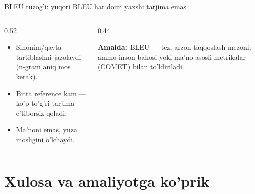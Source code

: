 \documentclass[aspectratio=169,11pt]{beamer}
\begin{document}
\begin{frame}{BLEU tuzog'i: yuqori BLEU har doim yaxshi tarjima emas}
  \begin{columns}[T]
    \begin{column}{0.52\textwidth}
      \begin{tcolorbox}[warnbox,title=Cheklovlar]
        \small
        \begin{itemize}\setlength\itemsep{2pt}
          \item Sinonim/qayta tartiblashni jazolaydi (n-gram aniq mos kerak).
          \item Bitta reference kam --- ko'p to'g'ri tarjima e'tiborsiz qoladi.
          \item Ma'noni emas, yuza mosligini o'lchaydi.
        \end{itemize}
      \end{tcolorbox}
    \end{column}
    \begin{column}{0.44\textwidth}
      \begin{tcolorbox}[okbox,top=2pt,bottom=2pt]
        \footnotesize
        \textbf{Amalda:} BLEU --- tez, arzon taqqoslash mezoni; ammo inson bahosi
        yoki ma'no-asosli metrikalar (COMET) bilan to'ldiriladi.
      \end{tcolorbox}
    \end{column}
  \end{columns}
\end{frame}

\section[Xulosa]{Xulosa va amaliyotga ko'prik}
\end{document}
